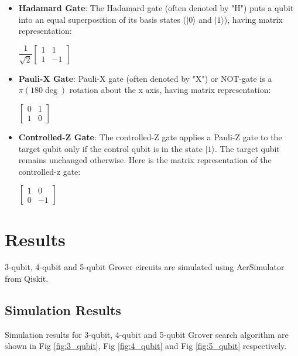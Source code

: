 \documentclass[conference]{IEEEtran}
\begin{document}
\begin{itemize}
	\item \textbf{Hadamard Gate}: The Hadamard gate (often denoted by "H") puts a qubit into an equal superposition of its basis states ($| 0 \rangle $ and $| 1 \rangle $),
	      having matrix representation: \\
	      \begin{center}
		      $\dfrac{1}{\sqrt{2}}
			      \begin{bmatrix}
				      1 & 1  \\
				      1 & -1
			      \end{bmatrix}$
	      \end{center}
	\item \textbf{Pauli-X Gate}: Pauli-X gate (often denoted by "X") or NOT-gate is a $ \pi (180\deg) $ rotation about the x axis, having matrix representation:
	      \begin{center}
		      $ \begin{bmatrix}
				      0 & 1 \\
				      1 & 0
			      \end{bmatrix}$
	      \end{center}
	\item \textbf{Controlled-Z Gate}: The controlled-Z gate applies a
	      Pauli-Z gate to the target qubit only if the control qubit is
	      in the state  $| 1 \rangle $. The target qubit remains unchanged otherwise. Here is the matrix representation of the controlled-z gate:
	      \begin{center}
		      $ \begin{bmatrix}
				      1 & 0  \\
				      0 & -1
			      \end{bmatrix} $
	      \end{center}
\end{itemize}

\section{Results}
3-qubit, 4-qubit and 5-qubit Grover circuits are simulated using AerSimulator from Qiskit.

\subsection{Simulation Results}
Simulation results for 3-qubit, 4-qubit and 5-qubit Grover
search algorithm are shown in Fig \ref{fig:3_qubit}, Fig \ref{fig:4_qubit} and Fig \ref{fig:5_qubit} respectively.
\end{document}
